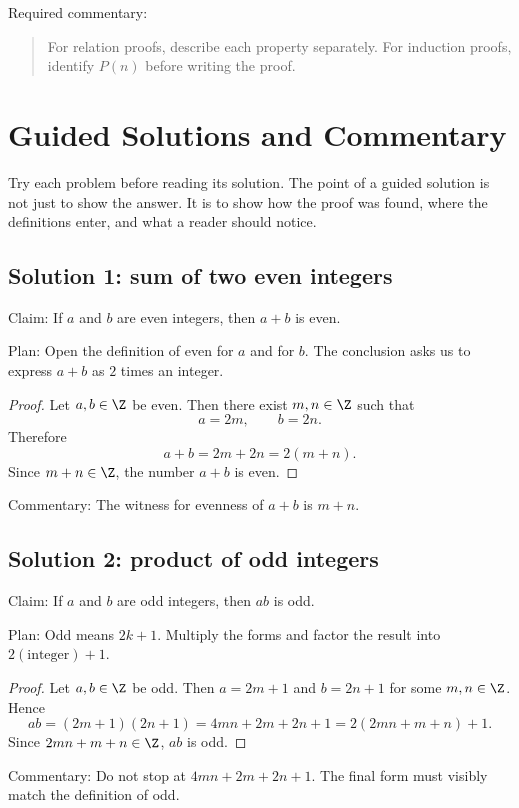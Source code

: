 Required commentary:

\begin{quote}
For relation proofs, describe each property separately. For induction proofs, identify $P(n)$ before writing the proof.
\end{quote}

\section{Guided Solutions and Commentary}
\chapterline

Try each problem before reading its solution. The point of a guided solution is not just to show the answer. It is to show how the proof was found, where the definitions enter, and what a reader should notice.

\subsection{Solution 1: sum of two even integers}

Claim: If $a$ and $b$ are even integers, then $a+b$ is even.

Plan: Open the definition of even for $a$ and for $b$. The conclusion asks us to express $a+b$ as $2$ times an integer.

\begin{proof}
Let $a,b\in\Z$ be even. Then there exist $m,n\in\Z$ such that
\[
a=2m,\qquad b=2n.
\]
Therefore
\[
a+b=2m+2n=2(m+n).
\]
Since $m+n\in\Z$, the number $a+b$ is even.
\end{proof}

Commentary: The witness for evenness of $a+b$ is $m+n$.

\subsection{Solution 2: product of odd integers}

Claim: If $a$ and $b$ are odd integers, then $ab$ is odd.

Plan: Odd means $2k+1$. Multiply the forms and factor the result into $2(\text{integer})+1$.

\begin{proof}
Let $a,b\in\Z$ be odd. Then $a=2m+1$ and $b=2n+1$ for some $m,n\in\Z$. Hence
\[
ab=(2m+1)(2n+1)=4mn+2m+2n+1=2(2mn+m+n)+1.
\]
Since $2mn+m+n\in\Z$, $ab$ is odd.
\end{proof}

Commentary: Do not stop at $4mn+2m+2n+1$. The final form must visibly match the definition of odd.

